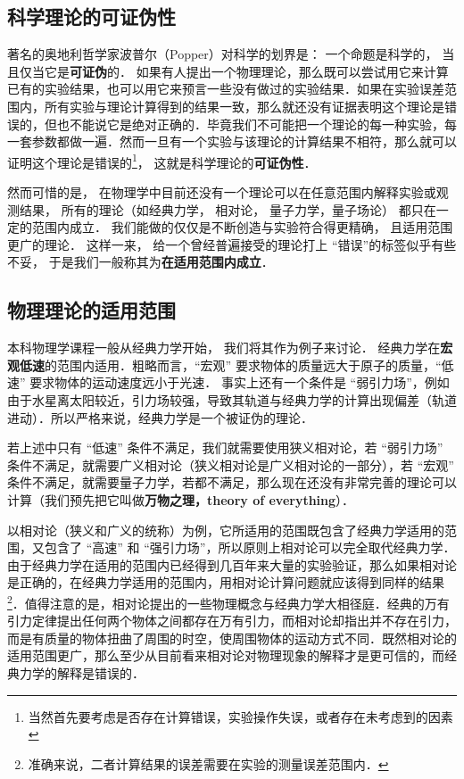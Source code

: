 

\subsection{科学理论的可证伪性}

著名的奥地利哲学家波普尔（Popper）对科学的划界是： 一个命题是科学的， 当且仅当它是\textbf{可证伪}的． 如果有人提出一个物理理论，那么既可以尝试用它来计算已有的实验结果，也可以用它来预言一些没有做过的实验结果．如果在实验误差范围内，所有实验与理论计算得到的结果一致，那么就还没有证据表明这个理论是错误的，但也不能说它是绝对正确的．毕竟我们不可能把一个理论的每一种实验，每一套参数都做一遍．然而一旦有一个实验与该理论的计算结果不相符，那么就可以证明这个理论是错误的\footnote{当然首先要考虑是否存在计算错误，实验操作失误，或者存在未考虑到的因素}， 这就是科学理论的\textbf{可证伪性}．

然而可惜的是， 在物理学中目前还没有一个理论可以在任意范围内解释实验或观测结果， 所有的理论（如经典力学， 相对论， 量子力学，量子场论） 都只在一定的范围内成立． 我们能做的仅仅是不断创造与实验符合得更精确， 且适用范围更广的理论． 这样一来， 给一个曾经普遍接受的理论打上 “错误”的标签似乎有些不妥， 于是我们一般称其为\textbf{在适用范围内成立}．

\subsection{物理理论的适用范围}
本科物理学课程一般从经典力学开始， 我们将其作为例子来讨论． 经典力学在\textbf{宏观低速}的范围内适用．粗略而言，“宏观” 要求物体的质量远大于原子的质量，“低速” 要求物体的运动速度远小于光速． 事实上还有一个条件是 “弱引力场”，例如由于水星离太阳较近，引力场较强，导致其轨道与经典力学的计算出现偏差（轨道进动）．所以严格来说，经典力学是一个被证伪的理论．

若上述中只有 “低速” 条件不满足，我们就需要使用狭义相对论，若 “弱引力场” 条件不满足，就需要广义相对论（狭义相对论是广义相对论的一部分），若 “宏观” 条件不满足，就需要量子力学，若都不满足，那么现在还没有非常完善的理论可以计算（我们预先把它叫做\textbf{万物之理，theory of everything}）．

以相对论（狭义和广义的统称）为例，它所适用的范围既包含了经典力学适用的范围，又包含了 “高速” 和 “强引力场”，所以原则上相对论可以完全取代经典力学．由于经典力学在适用的范围内已经得到几百年来大量的实验验证，那么如果相对论是正确的，在经典力学适用的范围内，用相对论计算问题就应该得到同样的结果\footnote{准确来说，二者计算结果的误差需要在实验的测量误差范围内．}．值得注意的是，相对论提出的一些物理概念与经典力学大相径庭．经典的万有引力定律提出任何两个物体之间都存在万有引力，而相对论却指出并不存在引力，而是有质量的物体扭曲了周围的时空，使周围物体的运动方式不同．既然相对论的适用范围更广，那么至少从目前看来相对论对物理现象的解释才是更可信的，而经典力学的解释是错误的． 

